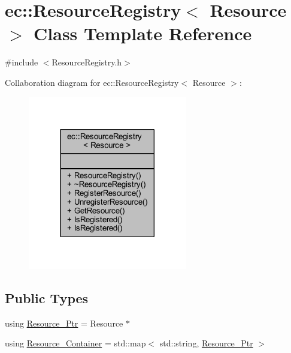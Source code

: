\hypertarget{classec_1_1_resource_registry}{}\section{ec\+:\+:Resource\+Registry$<$ Resource $>$ Class Template Reference}
\label{classec_1_1_resource_registry}


{\ttfamily \#include $<$Resource\+Registry.\+h$>$}



Collaboration diagram for ec\+:\+:Resource\+Registry$<$ Resource $>$\+:\nopagebreak
\begin{figure}[H]
\begin{center}
\leavevmode
\includegraphics[width=197pt]{classec_1_1_resource_registry__coll__graph}
\end{center}
\end{figure}
\subsection*{Public Types}
\begin{DoxyCompactItemize}
\item 
using \mbox{\hyperlink{classec_1_1_resource_registry_a77cf5381229bff47d251603c783115fe}{Resource\+\_\+\+Ptr}} = Resource $\ast$
\item 
using \mbox{\hyperlink{classec_1_1_resource_registry_a0a2b5090a2bbc638a04a2c283812b956}{Resource\+\_\+\+Container}} = std\+::map$<$ std\+::string, \mbox{\hyperlink{classec_1_1_resource_registry_a77cf5381229bff47d251603c783115fe}{Resource\+\_\+\+Ptr}} $>$
\end{DoxyCompactItemize}
